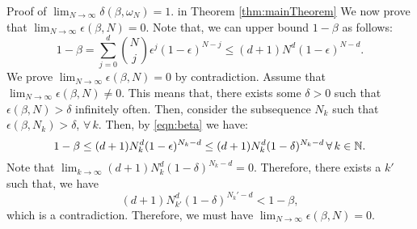\begin{subsection}{Proof of  $\lim_{N \to \infty}\delta(\beta, \omega_N) = 1.$ in Theorem \ref{thm:mainTheorem}}
We now prove that $\lim_{N \to \infty} \epsilon(\beta, N)= 0$. Note that, we can upper bound $1-\beta$ as follows:
\begin{equation}\label{eqn:beta}1-\beta = \sum_{j=0}^d {{N}\choose{j}} \epsilon^j (1-\epsilon)^{N-j} \leq  (d+1)N^d (1-\epsilon)^{N-d}.
\end{equation}
We prove $\lim_{N \to \infty} \epsilon(\beta, N) = 0$ by contradiction. Assume that $\lim_{N \to \infty} \epsilon(\beta, N) \not= 0$. This means that, there exists some $\delta > 0$ such that $\epsilon(\beta, N) > \delta$ infinitely often. Then, consider the subsequence $N_k$ such that $\epsilon(\beta, N_k) > \delta$, $\forall\, k.$ Then, by \eqref{eqn:beta} we have:
\begin{equation*}1-\beta\leq (d+1)N_k^d (1-\epsilon)^{N_k-d} \leq (d+1)N_k^d (1-\delta)^{N_k-d}\, \forall\,k \in \mathbb{N}. 
\end{equation*}
Note that $\lim_{k \to \infty}(d+1)N_k^d (1-\delta)^{N_k-d} = 0.$ Therefore, there exists a $k'$ such that, we have $$(d+1)N_{k'}^d (1-\delta)^{N_k'-d} < 1 - \beta,$$ which is a contradiction. Therefore, we must have  $\lim_{N \to \infty} \epsilon (\beta, N) = 0$.



\end{subsection}



